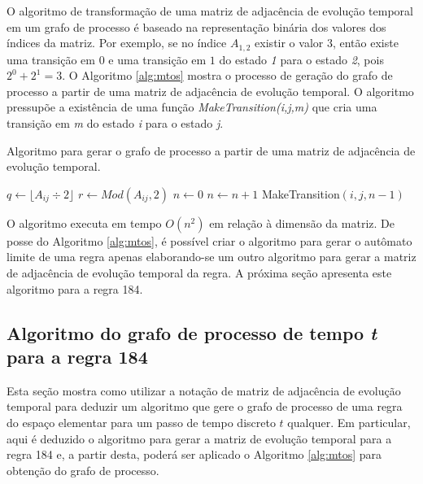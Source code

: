 \documentclass[12pt,a4paper]{article}
\begin{document}
O algoritmo de transformação de uma matriz de adjacência de evolução temporal em
um grafo de processo é baseado na representação binária dos valores dos
índices da matriz. Por exemplo, se no índice $A_{1,2}$ existir o valor
$3$, então existe uma transição em $0$ e uma transição em $1$ do estado
\emph{1} para o estado \emph{2}, pois $2^0+2^1=3$. O Algoritmo \ref{alg:mtos}
mostra o processo de geração do grafo de processo a partir de uma matriz de
adjacência de evolução temporal. O algoritmo pressupõe a existência de uma função
\emph{MakeTransition(i,j,m)} que cria uma transição em \emph{m} do estado
\emph{i} para o estado \emph{j}.

\begin{algorithm}
\caption{Algoritmo para gerar o grafo de processo a partir de uma matriz de
adjacência de evolução temporal.}
\label{alg:mtos}
\begin{algorithmic}
            \REPEAT
                \STATE $q \leftarrow \lfloor A_{ij} \div 2 \rfloor$
                \STATE $r \leftarrow Mod(A_{ij},2)$
                    \STATE $n \leftarrow 0$
                        \STATE $n \leftarrow n+1$
                    \ENDWHILE
                    \STATE MakeTransition$(i,j,n-1)$
                \ENDIF
        \ENDIF
    \ENDFOR
\ENDFOR
\end{algorithmic}
\end{algorithm}

O algoritmo executa em tempo $O(n^2)$ em relação à dimensão da matriz.
De posse do Algoritmo \ref{alg:mtos}, é possível criar o algoritmo para gerar o
autômato limite de uma regra apenas elaborando-se um outro algoritmo para gerar a
matriz de adjacência de evolução temporal da regra. A próxima seção apresenta este
algoritmo para a regra 184.

\subsection{Algoritmo do grafo de processo de tempo \emph{t} para a regra 184}\label{sec:184}

Esta seção mostra como utilizar a notação de matriz de adjacência
de evolução temporal para deduzir um algoritmo que gere o grafo de processo de uma
regra do espaço elementar para um passo de tempo discreto $t$ qualquer. Em
particular, aqui é deduzido o algoritmo para gerar a matriz de evolução temporal para
a regra 184 e, a partir desta, poderá ser aplicado o Algoritmo \ref{alg:mtos}
para obtenção do grafo de processo.
\end{document}
